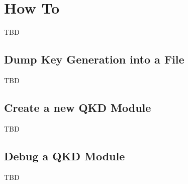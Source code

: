 \chapter{How To}
\label{chap:How To}

TBD

\section{Dump Key Generation into a File}
\label{sec:Dump Key Generation into a File}

TBD

\section{Create a new QKD Module}
\label{sec:Create a new QKD Module}

TBD

\section{Debug a QKD Module}
\label{sec:Debug a QKD Module}


TBD